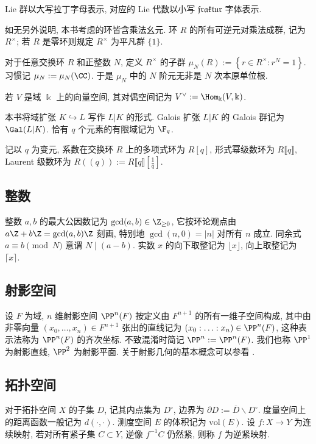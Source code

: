 Lie 群以大写拉丁字母表示, 对应的 Lie 代数以小写 $\mathfrak{fraktur}$ 字体表示.

如无另外说明, 本书考虑的环皆含乘法幺元. 环 $R$ 的所有可逆元对乘法成群, 记为 $R^\times$; 若 $R$ 是零环则规定 $R^\times$ 为平凡群 $\{1\}$.

对于任意交换环 $R$ 和正整数 $N$, 定义 $R^\times$ 的子群 $\mu_N(R) := \left\{ r \in R^\times: r^N = 1 \right\}$. 习惯记 $\mu_N := \mu_N(\CC)$. 于是 $\mu_N$ 中的 $N$ 阶元无非是 $N$ 次本原单位根. 

若 $V$ 是域 $\Bbbk$ 上的向量空间, 其对偶空间记为 $V^\vee := \Hom_\Bbbk(V, \Bbbk)$. 

本书将域扩张 $K \hookrightarrow L$ 写作 $L|K$ 的形式. Galois 扩张 $L|K$ 的 Galois 群记为 $\Gal(L|K)$. 恰有 $q$ 个元素的有限域记为 $\F_q$. 

记以 $q$ 为变元, 系数在交换环 $R$ 上的多项式环为 $R[q]$, 形式幂级数环为 $R\llbracket q \rrbracket$, Laurent 级数环为 $R(\!(q)\!) := R\llbracket q\rrbracket \left[\frac{1}{q}\right]$.

\subsection*{整数} 
整数 $a,b$ 的最大公因数记为 $\gcd(a,b) \in \Z_{\geq 0}$, 它按环论观点由 $a\Z + b\Z = \gcd(a,b) \Z$ 刻画, 特别地 $\gcd(n,0) = |n|$ 对所有 $n$ 成立. 同余式 $a \equiv b \pmod N$ 意谓 $N \mid (a-b)$. 实数 $x$ 的向下取整记为 $\lfloor x \rfloor$, 向上取整记为 $\lceil x \rceil$.

\subsection*{射影空间}
设 $F$ 为域, $n$ 维射影空间 $\PP^n(F)$ 按定义由 $F^{n+1}$ 的所有一维子空间构成, 其中由非零向量 $(x_0, \ldots, x_n) \in F^{n+1}$ 张出的直线记为 $(x_0 : \ldots : x_n) \in \PP^n(F)$, 这种表示法称为 $\PP^n(F)$ 的齐次坐标. 不致混淆时简记 $\PP^n := \PP^n(F)$. 我们也称 $\PP^1$ 为射影直线, $\PP^2$ 为射影平面. 关于射影几何的基本概念可以参看 \cite[\S 5.3]{Xi18}.  

\subsection*{拓扑空间}
对于拓扑空间 $X$ 的子集 $D$, 记其内点集为 $D^\circ$, 边界为 $\partial D := \overline{D} \smallsetminus D^\circ$. 度量空间上的距离函数一般记为 $d(\cdot, \cdot)$. 测度空间 $E$ 的体积记为 $\mathrm{vol}(E)$. 设 $f: X \to Y$ 为连续映射, 若对所有紧子集 $C \subset Y$, 逆像 $f^{-1}C$ 仍然紧, 则称 $f$ 为逆紧映射.

